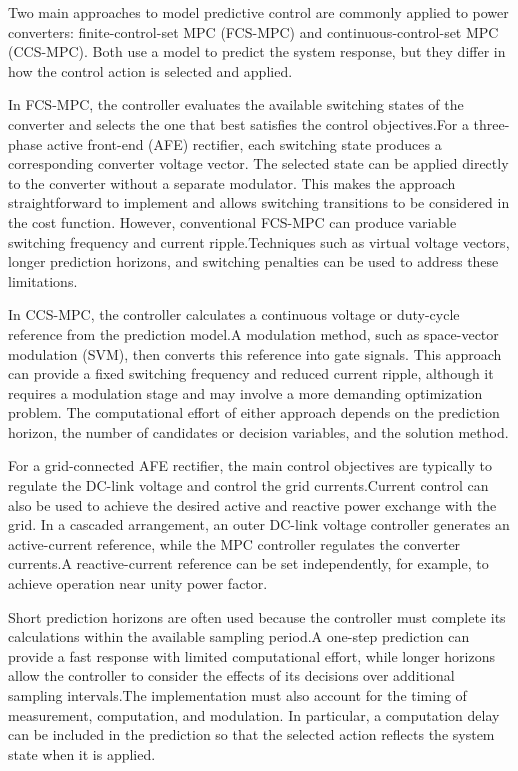 Two main approaches to model predictive control are commonly applied to power converters: finite-control-set MPC (FCS-MPC) and continuous-control-set MPC (CCS-MPC). Both use a model to predict the system response, but they differ in how the control action is selected and applied.

In FCS-MPC, the controller evaluates the available switching states of the converter and selects the one that best satisfies the control objectives.For a three-phase active front-end (AFE) rectifier, each switching state produces a corresponding converter voltage vector. The selected state can be applied directly to the converter without a separate modulator. This makes the approach straightforward to implement and allows switching transitions to be considered in the cost function. However, conventional FCS-MPC can produce variable switching frequency and current ripple.Techniques such as virtual voltage vectors, longer prediction horizons, and switching penalties can be used to address these limitations.

In CCS-MPC, the controller calculates a continuous voltage or duty-cycle reference from the prediction model.A modulation method, such as space-vector modulation (SVM), then converts this reference into gate signals. This approach can provide a fixed switching frequency and reduced current ripple, although it requires a modulation stage and may involve a more demanding optimization problem. The computational effort of either approach depends on the prediction horizon, the number of candidates or decision variables, and the solution method.

For a grid-connected AFE rectifier, the main control objectives are typically to regulate the DC-link voltage and control the grid currents.Current control can also be used to achieve the desired active and reactive power exchange with the grid. In a cascaded arrangement, an outer DC-link voltage controller generates an active-current reference, while the MPC controller regulates the converter currents.A reactive-current reference can be set independently, for example, to achieve operation near unity power factor.

Short prediction horizons are often used because the controller must complete its calculations within the available sampling period.A one-step prediction can provide a fast response with limited computational effort, while longer horizons allow the controller to consider the effects of its decisions over additional sampling intervals.The implementation must also account for the timing of measurement, computation, and modulation. In particular, a computation delay can be included in the prediction so that the selected action reflects the system state when it is applied.

